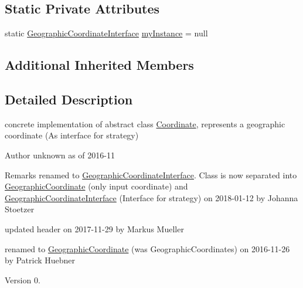 \subsection*{Static Private Attributes}
\begin{DoxyCompactItemize}
\item 
static \hyperlink{classcoordinates_1_1_geographic_coordinate_interface}{Geographic\+Coordinate\+Interface} \hyperlink{classcoordinates_1_1_geographic_coordinate_interface_a8dca565dec7a9f95c0366e9345dc6f62}{my\+Instance} = null
\end{DoxyCompactItemize}
\subsection*{Additional Inherited Members}


\subsection{Detailed Description}
concrete implementation of abstract class \hyperlink{classcoordinates_1_1_coordinate}{Coordinate}, represents a geographic coordinate (As interface for strategy)~\newline
 

\begin{DoxyAuthor}{Author}
unknown as of 2016-\/11 
\end{DoxyAuthor}
\begin{DoxyRemark}{Remarks}
renamed to \hyperlink{classcoordinates_1_1_geographic_coordinate_interface}{Geographic\+Coordinate\+Interface}. Class is now separated into \hyperlink{classcoordinates_1_1_geographic_coordinate}{Geographic\+Coordinate} (only input coordinate) and \hyperlink{classcoordinates_1_1_geographic_coordinate_interface}{Geographic\+Coordinate\+Interface} (Interface for strategy) on 2018-\/01-\/12 by Johanna Stoetzer 

updated header on 2017-\/11-\/29 by Markus Mueller 

renamed to \hyperlink{classcoordinates_1_1_geographic_coordinate}{Geographic\+Coordinate} (was Geographic\+Coordinates) on 2016-\/11-\/26 by Patrick Huebner 
\end{DoxyRemark}
\begin{DoxyVersion}{Version}
0. 
\end{DoxyVersion}


